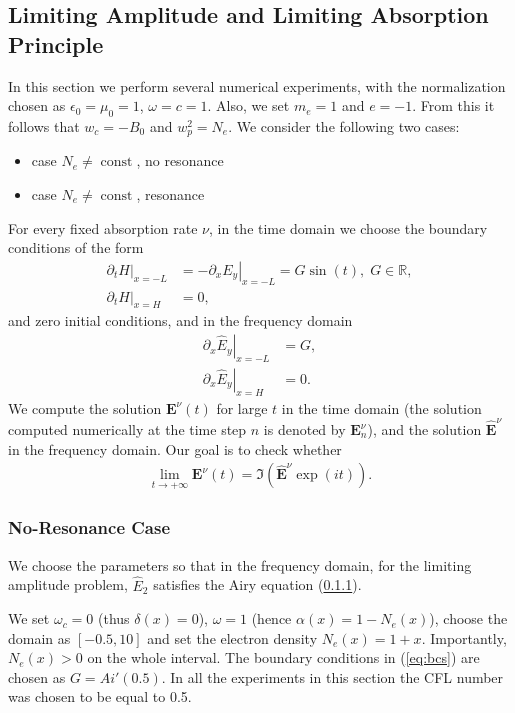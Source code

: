 
\subsection{Limiting Amplitude and Limiting Absorption Principle}
In this section we perform several numerical experiments,
with the normalization chosen as $\epsilon_0=\mu_0=1$, $\omega=c=1$. 
Also, we set $m_e=1$ and $e=-1$. From this it follows that $w_c=-B_0$ and $w_p^2=N_e$. 
We consider the following two cases:
\begin{itemize}
 \item case $N_e\neq \operatorname{const}$, no resonance
 \item case $N_e\neq \operatorname{const}$, resonance
\end{itemize}
For every fixed absorption rate $\nu$, in the time domain we choose the boundary conditions of the form
\begin{align}
\label{eq:bcs}
\left.\partial_t H\right|_{x=-L}&=-\left.\partial_x E_y\right|_{x=-L}=G\sin(t),\; G\in \mathbb{R}, \\
 \nonumber
 \left.\partial_t H\right|_{x=H}&=0,
\end{align}
and zero initial conditions, and in the frequency domain
\begin{align*}
 \left.\partial_x \hat{E}_y\right|_{x=-L}&=G,\\
 \left.\partial_x \hat{E}_y\right|_{x=H}&=0.
\end{align*}
We compute the solution $\mathbf{E}^{\nu}(t)$ for large $t$ in the time domain (the solution computed numerically at the time step $n$ is denoted by $\mathbf{E}^{\nu}_{n}$), and the solution $\hat{\mathbf{E}}^{\nu}$ in the frequency domain. 
Our goal is to check whether
\begin{align*}
\lim_{t\rightarrow+\infty}\mathbf{E}^{\nu}(t)=\Im\left(\hat{\mathbf{E}}^{\nu}\exp(it)\right).
\end{align*}

\subsubsection{No-Resonance Case}
We choose the parameters so that in the frequency domain, for the limiting amplitude problem, $\hat{E}_{2}$ satisfies 
the Airy equation (\ref{}). 

We set $\omega_c=0$ (thus $\delta(x)=0$), $\omega=1$ (hence $\alpha(x)=1-N_e(x)$), 
choose the domain as $[-0.5, 10]$ and set the electron density $N_e(x)=1+x$. Importantly, $N_e(x)>0$ on the whole interval.
The boundary conditions in (\ref{eq:bcs}) are chosen as $G=Ai'(0.5)$. 
In all the experiments in this section the CFL number was chosen to be equal to 0.5.


